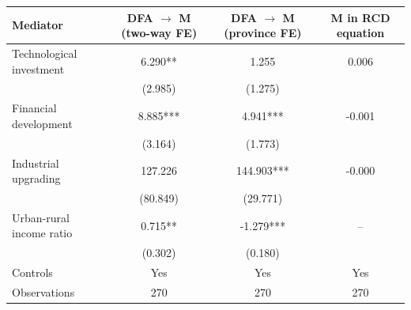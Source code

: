 \begin{tabular}{lccc}
\toprule
Mediator & DFA $\to$ M (two-way FE) & DFA $\to$ M (province FE) & M in RCD equation \\
\midrule
Technological investment & 6.290** & 1.255 & 0.006 \\
 & (2.985) & (1.275) & \\[2pt]
Financial development & 8.885*** & 4.941*** & -0.001 \\
 & (3.164) & (1.773) & \\[2pt]
Industrial upgrading & 127.226 & 144.903*** & -0.000 \\
 & (80.849) & (29.771) & \\[2pt]
Urban-rural income ratio & 0.715** & -1.279*** & -- \\
 & (0.302) & (0.180) & \\[2pt]
Controls & Yes & Yes & Yes \\
Observations & 270 & 270 & 270 \\
\bottomrule
\end{tabular}